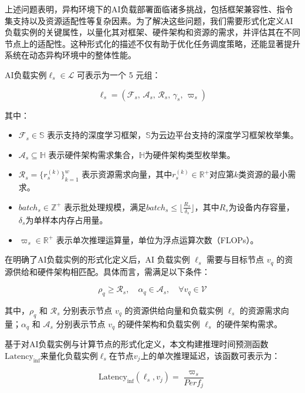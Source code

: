 上述问题表明，异构环境下的AI负载部署面临诸多挑战，包括框架兼容性、指令集支持以及资源适配性等复杂因素。为了解决这些问题，我们需要形式化定义AI负载实例的关键属性，以量化其对框架、硬件架构和资源的需求，并评估其在不同节点上的适配性。这种形式化的描述不仅有助于优化任务调度策略，还能显著提升系统在动态异构环境中的整体性能。

\begin{definition}[AI负载实例] 
\label{def:aimodel}
AI负载实例$\ell_s \in \mathcal{L}$ 可表示为一个 5 元组：
\end{definition}

$$
\ell_s = (\mathcal{F}_s,\, \mathcal{A}_s,\, \mathcal{R}_s,\, \gamma_s,\, \varpi_s)
$$

其中：
\begin{itemize}
    \item $\mathcal{F}_s \in \mathbb{S}$ 表示支持的深度学习框架，$\mathbb{S}$为云边平台支持的深度学习框架枚举集。
    \item $\mathcal{A}_s \subseteq \mathbb{H}$ 表示硬件架构需求集合，$\mathbb{H}$为硬件架构类型枚举集。
    \item $\mathcal{R}_s = \{r^{(k)}_s\}_{k=1}^w$ 表示资源需求向量，其中$r^{(k)}_s \in \mathbb{R}^+$对应第$k$类资源的最小需求。
    \item $batch_s \in \mathbb{Z}^+$ 表示批处理规模，满足$batch_s \leq \lfloor \frac{R_s}{\delta_s} \rfloor$，其中$R_s$为设备内存容量，$\delta_s$为单样本内存占用量。
    \item $\varpi_s \in \mathbb{R}^+$ 表示单次推理运算量，单位为浮点运算次数（FLOPs）。
\end{itemize}

在明确了AI负载实例的形式化定义后，AI 负载实例 $\ell_s$ 需要与目标节点 $v_q$ 的资源供给和硬件架构相匹配。具体而言，需满足以下条件：

\begin{equation}
\rho_q \geq \mathcal{R}_s, \quad \alpha_q \in \mathcal{A}_s, \quad \forall v_q \in \mathcal{V}
\end{equation}

其中，$\rho_{q}$ 和 $\mathcal{R}_s$ 分别表示节点 $v_q$ 的资源供给向量和负载实例 $\ell_s$ 的资源需求向量；$\alpha_q$ 和 $\mathcal{A}_s$ 分别表示节点 $v_q$ 的硬件架构和负载实例 $\ell_s$ 的硬件架构需求。

基于对AI负载实例与计算节点的形式化定义，本文构建推理时间预测函数$\text{Latency}_{\text{inf}}$来量化负载实例$\ell_s$在节点$v_j$上的单次推理延迟，该函数可表示为：

\begin{equation}
\text{Latency}_{\text{inf}}(\ell_s, v_j)= \frac{\varpi_s}{Perf_j}
\end{equation}

